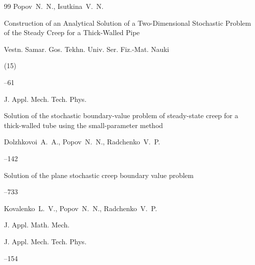 \begin{thebibliography}{99}
\by Popov~N.~N., Isutkina~V.~N.

\paper Construction of an Analytical Solution of a Two-Dimensional Stochastic Problem of the Steady Creep for a Thick-Walled Pipe

\jour Vestn. Samar. Gos. Tekhn. Univ. Ser. Fiz.-Mat. Nauki


(15)

--61











\jour J. Appl. Mech. Tech. Phys.

\paper Solution of the stochastic boundary-value problem of steady-state creep for a thick-walled tube using the small-parameter method

\by Dolzhkovoi~A.~A., Popov~N.~N., Radchenko~V.~P.




--142






\paper Solution of the plane stochastic creep boundary value problem

--733

\by Kovalenko~L.~V., Popov~N.~N., Radchenko~V.~P.

\jour J. Appl. Math. Mech.








\jour J. Appl. Mech. Tech. Phys.




--154


\end{thebibliography}
